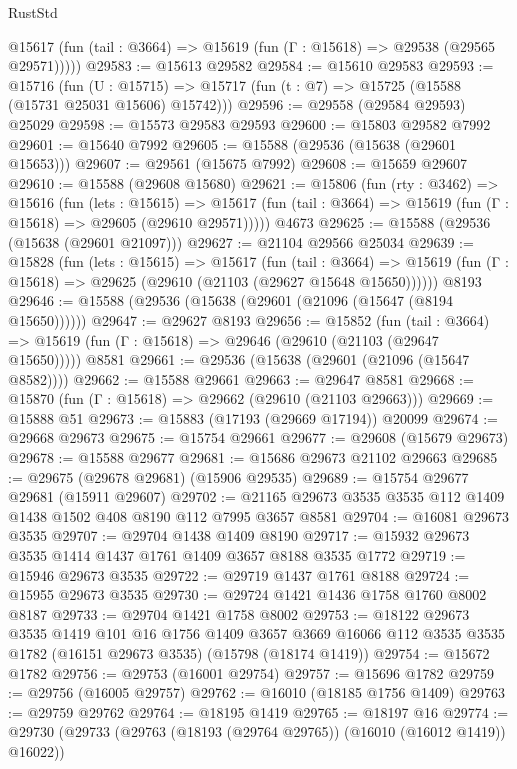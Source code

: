 \begin{lexlean}{RustStd}
\begin{coremodule}
      @15617 (fun (tail : @3664) => @15619 (fun (Γ : @15618) => @29538 (@29565 @29571)))))
@29583 := @15613 @29582
@29584 := @15610 @29583
@29593 := @15716
    (fun (U : @15715) => @15717 (fun (t : @7) => @15725 (@15588 (@15731 @25031 @15606) @15742)))
@29596 := @29558 (@29584 @29593) @25029
@29598 := @15573 @29583 @29593
@29600 := @15803 @29582 @7992
@29601 := @15640 @7992
@29605 := @15588 (@29536 (@15638 (@29601 @15653)))
@29607 := @29561 (@15675 @7992)
@29608 := @15659 @29607
@29610 := @15588 (@29608 @15680)
@29621 := @15806
    (fun (rty : @3462) =>
    @15616
      (fun (lets : @15615) =>
      @15617 (fun (tail : @3664) => @15619 (fun (Γ : @15618) => @29605 (@29610 @29571)))))
    @4673
@29625 := @15588 (@29536 (@15638 (@29601 @21097)))
@29627 := @21104 @29566 @25034
@29639 := @15828
    (fun (lets : @15615) =>
    @15617
      (fun (tail : @3664) =>
      @15619 (fun (Γ : @15618) => @29625 (@29610 (@21103 (@29627 @15648 @15650))))))
    @8193
@29646 := @15588 (@29536 (@15638 (@29601 (@21096 (@15647 (@8194 @15650))))))
@29647 := @29627 @8193
@29656 := @15852
    (fun (tail : @3664) => @15619 (fun (Γ : @15618) => @29646 (@29610 (@21103 (@29647 @15650)))))
    @8581
@29661 := @29536 (@15638 (@29601 (@21096 (@15647 @8582))))
@29662 := @15588 @29661
@29663 := @29647 @8581
@29668 := @15870 (fun (Γ : @15618) => @29662 (@29610 (@21103 @29663)))
@29669 := @15888 @51
@29673 := @15883 (@17193 (@29669 @17194)) @20099
@29674 := @29668 @29673
@29675 := @15754 @29661
@29677 := @29608 (@15679 @29673)
@29678 := @15588 @29677
@29681 := @15686 @29673 @21102 @29663
@29685 := @29675 (@29678 @29681) (@15906 @29535)
@29689 := @15754 @29677 @29681 (@15911 @29607)
@29702 := @21165 @29673 @3535 @3535 @112 @1409 @1438 @1502 @408 @8190 @112 @7995 @3657 @8581
@29704 := @16081 @29673 @3535
@29707 := @29704 @1438 @1409 @8190
@29717 := @15932 @29673 @3535 @1414 @1437 @1761 @1409 @3657 @8188 @3535 @1772
@29719 := @15946 @29673 @3535
@29722 := @29719 @1437 @1761 @8188
@29724 := @15955 @29673 @3535
@29730 := @29724 @1421 @1436 @1758 @1760 @8002 @8187
@29733 := @29704 @1421 @1758 @8002
@29753 := @18122
    @29673
    @3535
    @1419
    @101
    @16
    @1756
    @1409
    @3657
    @3669
    @16066
    @112
    @3535
    @3535
    @1782
    (@16151 @29673 @3535)
    (@15798 (@18174 @1419))
@29754 := @15672 @1782
@29756 := @29753 (@16001 @29754)
@29757 := @15696 @1782
@29759 := @29756 (@16005 @29757)
@29762 := @16010 (@18185 @1756 @1409)
@29763 := @29759 @29762
@29764 := @18195 @1419
@29765 := @18197 @16
@29774 := @29730 (@29733 (@29763 (@18193 (@29764 @29765)) (@16010 (@16012 @1419)) @16022))

\end{coremodule}
\end{lexlean}

